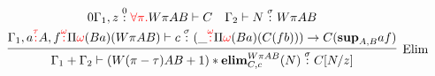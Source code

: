 \documentclass[12pt,a4paper]{article}
\begin{document}
$$
\infer[\text{Elim}]{\Gamma_1 + \Gamma_2 \vdash (W(\pi - \tau)A B + 1) * \mathbf{elim}^{W\pi AB}_{C, c}(N)  \of{\sigma}  C[N/z]}{
  \deduce{\Gamma_1, a \textcolor{red}{\of\tau} A, f \textcolor{red}{\of\omega} \Pi \textcolor{red}\omega (B a) (W\pi A B) \vdash c \of{\sigma} (\_ \textcolor{red}{\of{\omega}} \Pi \textcolor{red}{\omega} (B a)(C (f b))) \to C(\mathbf{sup}_{A,B} a f)}{
    \deduce{} {
    0\Gamma_1, z \overset{0} :\textcolor{red}{\forall \pi.} W \pi A B \vdash C 
    &
    \Gamma_2 \vdash N \overset{\sigma}: W \pi A B  }}}
$$


\printbibliography
\end{document}
